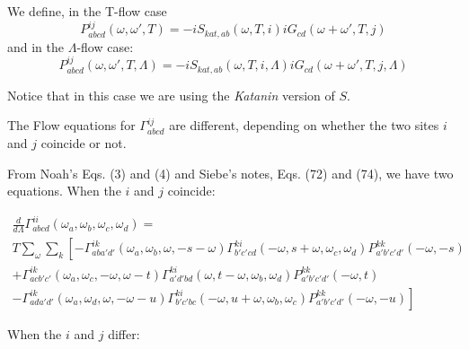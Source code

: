 \documentclass{article}
\begin{document}
We define, in the T-flow case
\begin{equation}
  P^{ij}_{abcd}(\omega,\omega',T) = -iS_{kat,ab}(\omega,T,i)iG_{cd}(\omega+\omega',T,j)
\end{equation}
and in the $\Lambda$-flow case:
\begin{equation}
  P^{ij}_{abcd}(\omega,\omega',T,\Lambda) = -iS_{kat,ab}(\omega,T,i,\Lambda)iG_{cd}(\omega+\omega',T,j,\Lambda)
\end{equation}

Notice that in this case we are using the \emph{Katanin} version of $S$.

The Flow equations for $\Gamma^{ij}_{abcd}$ are different,
depending on whether the two sites $i$ and $j$ coincide
or not.


From Noah's Eqs. (3) and (4) and Siebe's notes, Eqs. (72) and (74),
we have two equations.
When the $i$ and $j$ coincide:

\begin{equation}
  \begin{aligned}
  \frac{d}{d\Lambda} \Gamma^{ii}_{abcd}(\omega_a,\omega_b,\omega_c,\omega_d) = \\
  T \sum_{\omega} \sum_k \left[ -\Gamma^{ik}_{aba'd'}(\omega_a,\omega_b,\omega,-s-\omega)
\Gamma^{ki}_{b'c'cd}(-\omega,s+\omega,\omega_c,\omega_d)P^{kk}_{a'b'c'd'}(-\omega,-s) \right. \\
+ \Gamma^{ik}_{acb'c'}(\omega_a,\omega_c,-\omega,\omega-t)\Gamma^{ki}_{a'd'bd}(\omega,t-\omega,\omega_b,\omega_d) P^{kk}_{a'b'c'd'}(-\omega,t) \\
\left. -\Gamma^{ik}_{ada'd'}(\omega_a,\omega_d,\omega,-\omega-u)\Gamma^{ki}_{b'c'bc}(-\omega,u+\omega,\omega_b,\omega_c) P^{kk}_{a'b'c'd'}(-\omega,-u) \right]
  \end{aligned}
\end{equation}

When the $i$ and $j$ differ:
\end{document}
